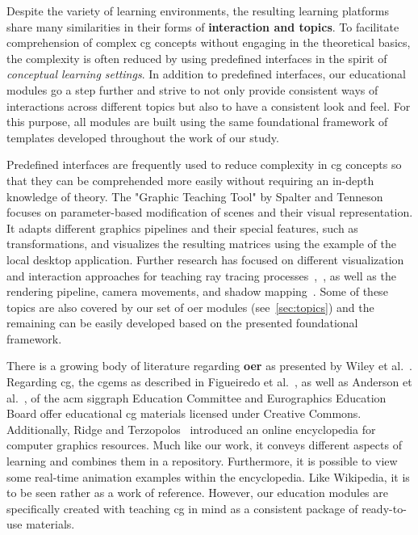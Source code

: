 Despite the variety of learning environments, the resulting learning platforms share many similarities in their forms of \textbf{interaction and topics}. To facilitate comprehension of complex \acrshort{cg} concepts without engaging in the theoretical basics, the complexity is often reduced by using predefined interfaces in the spirit of \emph{conceptual learning settings}. In addition to predefined interfaces, our educational modules go a step further and strive to not only provide consistent ways of interactions across different topics but also to have a consistent look and feel. For this purpose, all modules are built using the same foundational framework of templates developed throughout the work of our study.

Predefined interfaces are frequently used to reduce complexity in \acrshort{cg} concepts so that they can be comprehended more easily without requiring an in-depth knowledge of theory. The "Graphic Teaching Tool" by Spalter and Tenneson~\cite{Spalter:2006:cg-tool} focuses on parameter-based modification of scenes and their visual representation. It adapts different graphics pipelines and their special features, such as transformations, and visualizes the resulting matrices using the example of the local desktop application. Further research has focused on different visualization and interaction approaches for teaching ray tracing processes~\cite{Suselo:2018:cg-tool},~\cite{ Verschoore-de-la-Houssaije:2022:cg-tool}, as well as the rendering pipeline, camera movements, and shadow mapping~\cite{Eisemann:2023:cg-tool}. Some of these topics are also covered by our set of \acrshort{oer} modules (see~\autoref{sec:topics}) and the remaining can be easily developed based on the presented foundational framework.

There is a growing body of literature regarding \textbf{\acrfull{oer}} as presented by Wiley et al.~\cite{wiley:2014:oer}. Regarding \acrshort{cg}, the \acrfull{cgems} as described in Figueiredo et al.~\cite{figueiredo:2003:cgems}, \cite{figueiredo:2004:cgems2} as well as Anderson et al.~\cite{anderson:2017:NewCGEMS}, of the \acrshort{acm} \acrshort{siggraph} Education Committee and Eurographics Education Board offer educational \acrshort{cg} materials licensed under Creative Commons. Additionally, Ridge and Terzopolos~\cite{ridge:2019:ecosystem} introduced an online encyclopedia for computer graphics resources. Much like our work, it conveys different aspects of learning and combines them in a repository. Furthermore, it is possible to view some real-time animation examples within the encyclopedia. Like Wikipedia, it is to be seen rather as a work of reference. However, our education modules are specifically created with teaching \acrshort{cg} in mind as a consistent package of ready-to-use materials. %


